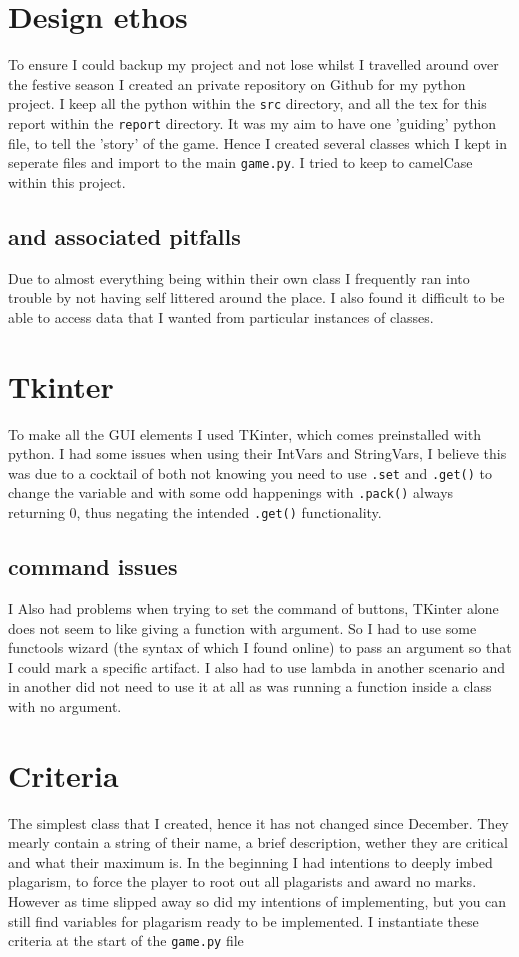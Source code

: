 \documentclass[twocolumn]{article}   %
\begin{document}
\section{Design ethos}
To ensure I could backup my project and not lose whilst I travelled around over the festive season I created an private repository on Github for my python project. I keep all the python within the \texttt{src} directory, and all the tex for this report within the \texttt{report} directory.
It was my aim to have one 'guiding' python file, to tell the 'story' of the game. Hence I created several classes which I kept in seperate files and import to the main \texttt{game.py}. I tried to keep to camelCase within this project.
  \subsection{and associated pitfalls}
  Due to almost everything being within their own class I frequently ran into trouble by not having self littered around the place. I also found it difficult to be able to access data that I wanted from particular instances of classes.

\section{Tkinter}
To make all the GUI elements I used TKinter\cite{TKinter}, which comes preinstalled with python. I had some issues when using their IntVars and StringVars, I believe this was due to a cocktail of both not knowing you need to use \texttt{.set} and \texttt{.get()} to change the variable and with some odd happenings with \texttt{.pack()} always returning 0, thus negating the intended \texttt{.get()} functionality.
  \subsection{command issues}
  I Also had problems when trying to set the command of buttons, TKinter alone does not seem to like giving a function with argument. So I had to use some functools wizard (the syntax of which I found online) to pass an argument so that I could mark a specific artifact. I also had to use lambda in another scenario and in another did not need to use it at all as was running a function inside a class with no argument.

\section{Criteria}
The simplest class that I created, hence it has not changed since December. They mearly contain a string of their name, a brief description, wether they are critical and what their maximum is. In the beginning I had intentions to deeply imbed plagarism, to force the player to root out all plagarists and award no marks. However as time slipped away so did my intentions of implementing, but you can still find variables for plagarism ready to be implemented. I instantiate these criteria at the start of the \texttt{game.py} file
\end{document}
